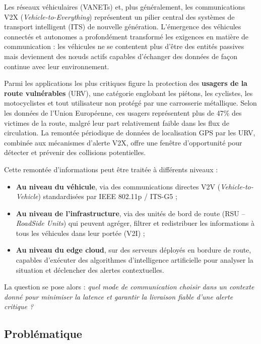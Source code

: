 \documentclass[12pt,a4paper]{article}
\begin{document}
Les réseaux véhiculaires (VANETs) et, plus généralement, les communications V2X
(\textit{Vehicle-to-Everything}) représentent un pilier central des systèmes de
transport intelligent (ITS) de nouvelle génération. L'émergence des véhicules connectés
et autonomes a profondément transformé les exigences en matière de communication :
les véhicules ne se contentent plus d'être des entités passives mais deviennent des
nœuds actifs capables d'échanger des données de façon continue avec leur environnement.

Parmi les applications les plus critiques figure la protection des \textbf{usagers de la
route vulnérables} (URV), une catégorie englobant les piétons, les cyclistes, les
motocyclistes et tout utilisateur non protégé par une carrosserie métallique. Selon les
données de l'Union Européenne, ces usagers représentent plus de 47\% des victimes
de la route, malgré leur part relativement faible dans les flux de circulation.
La remontée périodique de données de localisation GPS par les URV, combinée aux
mécanismes d'alerte V2X, offre une fenêtre d'opportunité pour détecter et prévenir
des collisions potentielles.

Cette remontée d'informations peut être traitée à différents niveaux :
\begin{itemize}[leftmargin=*]
  \item \textbf{Au niveau du véhicule}, via des communications directes V2V
        (\textit{Vehicle-to-Vehicle}) standardisées par IEEE 802.11p / ITS-G5 ;
  \item \textbf{Au niveau de l'infrastructure}, via des unités de bord de route
        (RSU -- \textit{RoadSide Units}) qui peuvent agréger, filtrer et redistribuer
        les informations à tous les véhicules dans leur portée (V2I) ;
  \item \textbf{Au niveau du edge cloud}, sur des serveurs déployés en bordure de route,
        capables d'exécuter des algorithmes d'intelligence artificielle pour analyser
        la situation et déclencher des alertes contextuelles.
\end{itemize}

La question se pose alors : \textit{quel mode de communication choisir dans un contexte
donné pour minimiser la latence et garantir la livraison fiable d'une alerte critique ?}

\subsection{Problématique}
\end{document}
